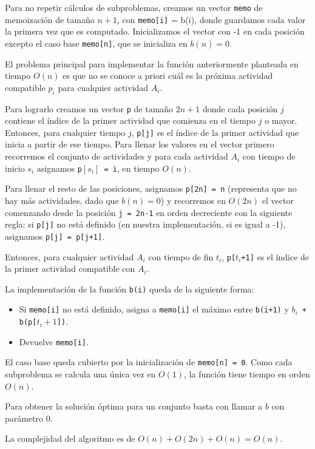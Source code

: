 \documentclass[10pt, a4paper]{article}
\begin{document}
Para no repetir cálculos de subproblemas, creamos un vector \texttt{memo} de memoización de tamaño $n+1$, con \texttt{memo[i]} = b(i), donde guardamos cada valor la primera vez que es computado. Inicializamos el vector con -1 en cada posición excepto el caso base \texttt{memo[n]}, que se inicializa en $b(n) = 0$.

El problema principal para implementar la función anteriormente planteada en tiempo $O(n)$ es que no se conoce a priori cuál es la próxima actividad compatible $p_i$ para cualquier actividad $A_i$.

Para lograrlo creamos un vector \texttt{p} de tamaño $2n+1$ donde cada posición $j$ contiene el índice de la primer actividad que comienza en el tiempo $j$ o mayor. Entonces, para cualquier tiempo $j$, \texttt{p[j]} es el índice de la primer actividad que inicia a partir de ese tiempo. Para llenar los valores en el vector primero recorremos el conjunto de actividades y para cada actividad $A_i$ con tiempo de inicio $s_i$ asignamos \texttt{p$[s_i]$ = i}, en tiempo $O(n)$. 

Para llenar el resto de las posiciones, asignamos \texttt{p[2n] = n} (representa que no hay más actividades, dado que $b(n) = 0$) y recorremos en $O(2n)$ el vector comenzando desde la posición \texttt{j = 2n-1} en orden decreciente con la siguiente regla: si \texttt{p[j]} no está definido (en nuestra implementación, si es igual a -1), asignamos \texttt{p[j] = p[j+1]}.

Entonces, para cualquier actividad $A_i$ con tiempo de fin $t_i$, \texttt{p[$t_i$+1]} es el índice de la primer actividad compatible con $A_i$.

La implementación de la función \texttt{b(i)} queda de la siguiente forma:
\begin{itemize}
    \item Si \texttt{memo[i]} no está definido, asigna a \texttt{memo[i]} el máximo entre \texttt{b(i+1)} y \texttt{$b_i$ + b(p[$t_{i}+1$])}.
    \item Devuelve \texttt{memo[i]}.
\end{itemize}
El caso base queda cubierto por la inicialización de \texttt{memo[n] = 0}. Como cada subproblema se calcula una única vez en $O(1)$, la función tiene tiempo en orden $O(n)$.

Para obtener la solución óptima para un conjunto basta con llamar a $b$ con parámetro 0.

La complejidad del algoritmo es de $O(n) + O(2n) + O(n) = O(n)$.
\end{document}
